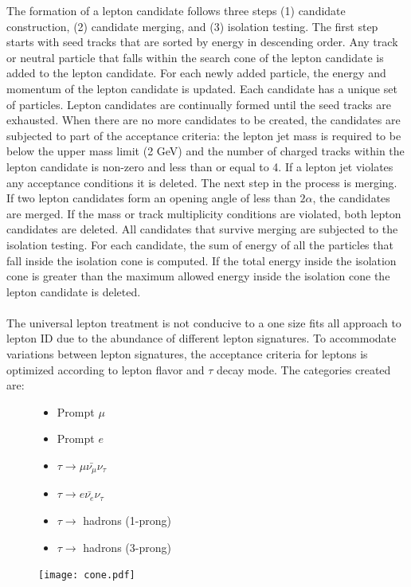 The formation of a lepton candidate follows three steps (1) candidate construction, (2) candidate merging, and (3) isolation testing.
The first step starts with seed tracks that are sorted by energy in descending order. Any track or neutral particle that falls within the search cone of the lepton candidate is added to the lepton candidate. For each newly added particle, the energy and momentum of the lepton candidate is updated. Each candidate has a unique set of particles. Lepton candidates are continually formed until the seed tracks are exhausted. When there are no more candidates to be created, the candidates are subjected to part of the acceptance criteria: the lepton jet mass is required to be below the upper mass limit (2 GeV) and the number of charged tracks within the lepton candidate is non-zero and less than or equal to 4. If a lepton jet violates any acceptance conditions it is deleted. The next step in the process is merging. If two lepton candidates form an opening angle of less than $2\alpha$, the candidates are merged. If the mass or track multiplicity conditions are violated, both lepton candidates are deleted.  All  candidates that survive merging are subjected to the isolation testing. For each candidate, the sum of energy of all the particles that fall inside the isolation cone is computed. If the total energy inside the isolation cone is greater than the maximum allowed energy inside the isolation cone the lepton candidate is deleted.\\
\quad \quad \\
The universal lepton treatment is not conducive to a one size fits all approach to lepton ID due to the abundance of different lepton signatures. To accommodate variations between lepton signatures, the acceptance criteria for leptons is optimized according to lepton flavor and $\tau$ decay mode. The categories created are:\\
\begin{figure}
\label{fig:cone}
\begin{minipage}[h]{0.48\textwidth}
\centering
\begin{itemize}
\item Prompt $\mu$
\item Prompt $e$
\item $\tau \rightarrow \mu \bar{\nu_{\mu}} \nu_{\tau} $
\item $\tau \rightarrow e \bar{\nu_{e}} \nu_{\tau} $
\item $\tau \rightarrow$ hadrons (1-prong)
\item $\tau \rightarrow$ hadrons (3-prong)
\end{itemize}
\end{minipage}\hfill
\begin{minipage}[h]{0.48\textwidth}


\texttt{[image: cone.pdf]}

\end{minipage}\\
\end{figure}
